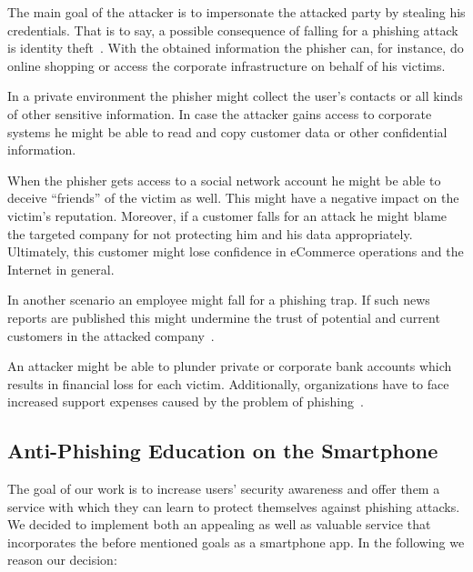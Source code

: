 \begin{description}[leftmargin=0cm]
\item[Identity Theft:] The main goal of the attacker is to impersonate the attacked party by stealing his credentials. That is to say, a possible consequence of falling for a phishing attack is identity theft~\cite{jakobsson2006phishing}. With the obtained information the phisher can, for instance, do online shopping or access the corporate infrastructure on behalf of his victims.
\item[Data Theft:]
In a private environment the phisher might collect the user's contacts or all kinds of other sensitive information.
In case the attacker gains access to corporate systems he might be able to read and copy customer data or other confidential information.
\item[Reputational Damage:]
When the phisher gets access to a social network account he might be able to deceive ``friends'' of the victim as well. This might have a negative impact on the victim's reputation.
Moreover, if a customer falls for an attack he might blame the targeted company for not protecting him and his data appropriately. 
Ultimately, this customer might lose confidence in eCommerce operations and the Internet in general.

In another scenario an employee might fall for a phishing trap.
If such news reports are published this might undermine the trust of potential and current customers in the attacked company~\cite{mcafee, redcondor}. 
\item[Financial Loss:]
An attacker might be able to plunder private or corporate bank accounts which results in financial loss for each victim. Additionally, organizations have to face increased support expenses caused by the problem of phishing~\cite{rsa2013, mcafee}.
\end{description}

\subsection{Anti-Phishing Education on the Smartphone}
\label{s:antiphishing_on_smartphone}
The goal of our work is to increase users' security awareness and offer them a service with which they can learn to protect themselves against phishing attacks.
We decided to implement both an appealing as well as valuable service that incorporates the before mentioned goals as a smartphone app.
In the following we reason our decision:

